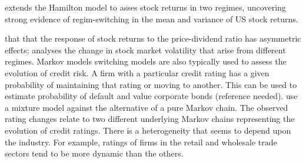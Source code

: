 \documentclass[12pt, a4paper, oneside]{article} %
\begin{document}



\citet{schaller1997regime} extends the Hamilton model to asses stock returns in two regimes, uncovering strong evidence of regim-switching in the mean and variance of US stock returns.  

that that the response of stock returns to the price-dividend ratio has asymmetric effects; \citet{dueker1997markov} analyses the change in stock market volatility that arise from different regimes. Markov models switching models are also typically used to assess the evolution of credit risk.  A firm with a particular credit rating has a given probability of maintaining that rating or moving to another.  This can be used to estimate probability of default and value corporate bonds (reference needed).  \citet{frydman2008credit} use a mixture model against the alternative of a pure Markov chain. The observed rating changes relate to two different underlying Markov chains representing the evolution of credit ratings.  There is a heterogeneity that seems to depend upon the industry.  For example, ratings of firms in the retail and wholesale trade sectors tend to be more dynamic than the others. 

\end{document}
